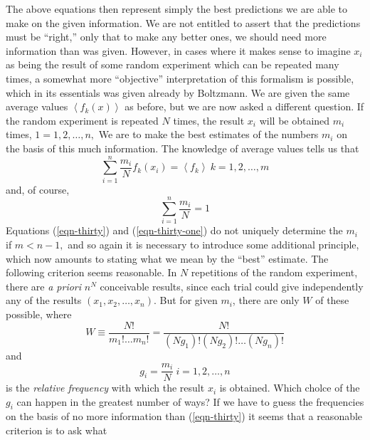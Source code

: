 \documentclass[]{article}
\begin{document}
The above equations then represent simply the best predictions we are
able to make on the given information. We are not entitled to assert
that the predictions must be ``right,'' only that to make any better
ones, we should need more information than was given. However, in cases
where it makes sense to imagine \(x_{i}\) as being the result of some
random experiment which can be repeated many times, a somewhat more
``objective'' interpretation of this formalism is possible, which in
its essentials was given already by Boltzmann. We are given the same
average values \(\left\langle f_{k}(x) \right\rangle\) as before, but we
are now asked a different question. If the random experiment is repeated
\(N\) times, the result \(x_{i}\) will be obtained \(m_{i}\) times,
\(1 = 1,2,\ldots,n,\) We are to make the best estimates of the numbers
\(m_{i}\) on the basis of this much information. The knowledge of
average values tells us that
%
\begin{equation}
\sum_{i = 1}^{n} \frac{m_{i}}{N}f_{k}\left( x_{i} \right) = \left\langle f_{k} \right\rangle\ k = 1,2,\ldots,m \label{eqn-thirty}
\end{equation}
%
and, of course,
%
\begin{equation}
\sum_{i = 1}^{n} \frac{m_{i}}{N} = 1 \label{eqn-thirty-one}
\end{equation}
%
Equations (\ref{eqn-thirty}) and (\ref{eqn-thirty-one}) do not uniquely determine the \(m_{i}\) if
\(m < n - 1,\) and so again it is necessary to introduce some additional
principle, which now amounts to stating what we mean by the ``best''
estimate. The following criterion seems reasonable. In \(N\) repetitions
of the random experiment, there are \emph{a priori} \(n^{N}\)
conceivable results, since each trial could give independently any of
the results \(\left( x_{1},x_{2},\ldots,x_{n} \right)\). But for given
\(m_{i}\), there are only \(W\) of these possible, where
%
\begin{equation}
W \equiv \frac{N!}{m_{1}!\ldots m_{n}!} = \frac{N!}{\left( Ng_{1} \right)!\left( Ng_{2} \right)!\ldots\left( Ng_{n} \right)!} \label{eqn-thirty-two}
\end{equation}
%
and
%
\begin{equation}
g_{i} = \frac{m_{i}}{N}\ i = 1,2,\ldots,n
\end{equation}
%
is the \emph{relative frequency} with which the result \(x_{i}\) is obtained.
Which cholce of the \(g_{i}\) can happen in the greatest number of ways?
If we have to guess the frequencies on the basis of no more information
than (\ref{eqn-thirty}) it seems that a reasonable criterion is to ask what
\end{document}
